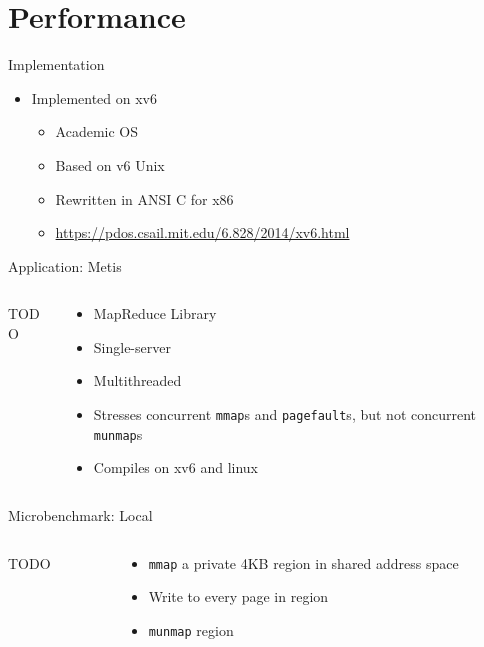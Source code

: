 \documentclass[aspectratio=169]{beamer}
\newcommand{\bi}{\begin{itemize}}
\newcommand{\ei}{\end{itemize}}
\begin{document}
\section{Performance}

\begin{frame}{Implementation}
  \begin{center}
    \bi
  \item Implemented on xv6
    \bi
  \item Academic OS
  \item Based on v6 Unix
  \item Rewritten in ANSI C for x86
  \item \url{https://pdos.csail.mit.edu/6.828/2014/xv6.html}
    \ei
    \ei
  \end{center}
\end{frame}

\begin{frame}{Application: Metis}
  \begin{columns}[T]
    \begin{column}{0.2\textwidth}
      TODO
    \end{column}
    \begin{column}{0.8\textwidth}
      \bi
    \item MapReduce Library
    \item Single-server
    \item Multithreaded
    \item Stresses concurrent \texttt{mmap}s and \texttt{pagefault}s, but not concurrent \texttt{munmap}s
    \item Compiles on xv6 and linux
      \ei
    \end{column}
  \end{columns}
\end{frame}

\begin{frame}{Microbenchmark: Local}
  \begin{columns}[T]
    \begin{column}{0.2\textwidth}
      TODO
    \end{column}
    \begin{column}{0.8\textwidth}
      \bi
    \item \texttt{mmap} a private 4KB region in shared address space
    \item Write to every page in region
    \item \texttt{munmap} region
      \ei
    \end{column}
  \end{columns}
\end{frame}
\end{document}
